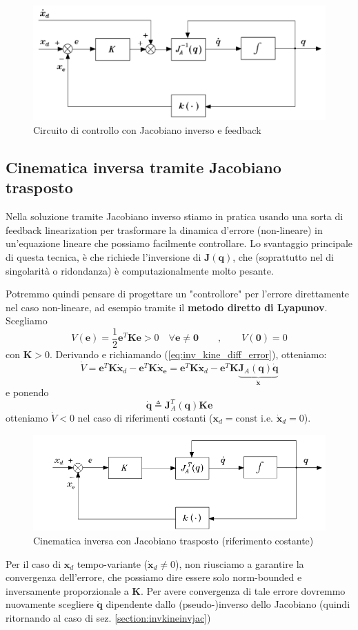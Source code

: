 \begin{figure}[!hb]
	\centering
	\includegraphics[width=0.7\linewidth]{images/diff_kine_13}
	\caption{Circuito di controllo con Jacobiano inverso e feedback}
	\label{fig:diffkine13}
\end{figure}




\subsection{Cinematica inversa tramite Jacobiano trasposto}
Nella soluzione tramite Jacobiano inverso stiamo in pratica usando una sorta di feedback linearization per trasformare la dinamica d'errore (non-lineare) in un'equazione lineare che possiamo facilmente controllare. Lo svantaggio principale di questa tecnica, è che richiede l'inversione di $\bm{J}(\bm{q})$, che (soprattutto nel di singolarità o ridondanza) è computazionalmente molto pesante.

Potremmo quindi pensare di progettare un "controllore" per l'errore direttamente nel caso non-lineare, ad esempio tramite il \textbf{metodo diretto di Lyapunov}. Scegliamo
$$
V(\bm{e})=\frac{1}{2}\bm{e}^{T}\bm{K}\bm{e} > 0 \quad \forall \bm{e} \neq \bm{0}
\qquad
,
\qquad
V(\bm{0}) = 0
$$
con $\bm{K} > 0$. Derivando e richiamando (\ref{eq:inv_kine_diff_error}), otteniamo:
$$
\dot{V}
=
\bm{e}^{T}\bm{K}\dot{\bm{x}}_{d} - \bm{e}^{T}\bm{K}\dot{\bm{x}}_{\bm{e}}
=
\bm{e}^{T}\bm{K}\dot{\bm{x}}_{d} - \bm{e}^{T}\bm{K} \underbrace{\bm{J}_A(\bm{q})\bm{\dot{q}}}_{\dot{\bm{x}}}
$$
e ponendo
$$
\dot{\bm{q}} \triangleq \bm{J}_{A}^{T}(\bm{q})\bm{K} \bm{e}
$$
otteniamo $\dot{V} < 0$ nel caso di riferimenti costanti ($\bm{x}_d = \text{const}$ i.e. $\bm{\dot{x}}_d = 0$).

\begin{figure}[!ht]
	\centering
	\includegraphics[width=0.7\linewidth]{images/diff_kine_14}
	\caption{Cinematica inversa con Jacobiano trasposto (riferimento costante)}
	\label{fig:diffkine14}
\end{figure}

Per il caso di $\bm{x}_d$ tempo-variante ($\bm{\dot{x}}_d \neq 0$), non riusciamo a garantire la convergenza dell'errore, che possiamo dire essere solo norm-bounded e inversamente proporzionale a $\bm{K}$. Per avere convergenza di tale errore dovremmo nuovamente scegliere $\dot{\bm{q}}$ dipendente dallo (pseudo-)inverso dello Jacobiano (quindi ritornando al caso di sez. \ref{section:invkineinvjac})